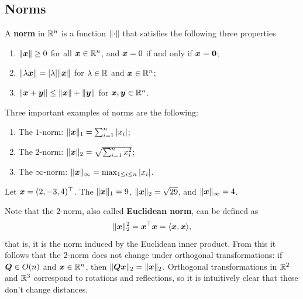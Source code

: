 \subsection{Norms}
A \textbf{norm} in $\mathbb{R}^n$ is a function $\Vert {\cdot}\Vert$ that satisfies the following three properties
\begin{enumerate}
 \item $\Vert {\bm{x}}\Vert\geq 0$ for all $\bm{x}\in \mathbb{R}^n$, and $\bm{x}=0$ if and only if $\bm{x}=\bm{0}$;
 \item $\Vert {\lambda \bm{x}}\Vert = |\lambda|\Vert {\bm{x}}\Vert$ for $\lambda\in \mathbb{R}$ and $\bm{x}\in \mathbb{R}^n$;
 \item $\Vert {\bm{x}+\bm{y}}\Vert\leq \Vert {\bm{x}}\Vert+\Vert {\bm{y}}\Vert$ for $\bm{x},\bm{y}\in \mathbb{R}^n$.
\end{enumerate}
Three important examples of norms are the following:
\begin{enumerate}
 \item The $1$-norm: $\Vert {\bm{x}}\Vert_1 = \sum_{i=1}^n |x_i|$;
 \item The $2$-norm: $\Vert {\bm{x}}\Vert_2 = \sqrt{\sum_{i=1}^n x_i^2}$;
 \item The $\infty$-norm: $\Vert {\bm{x}}\Vert_\infty = \max_{1\leq i\leq n} |x_i|$.
\end{enumerate}

\begin{example}
Let $\bm{x}=(2,-3,4)^{\top}$. The $\Vert {\bm{x}}\Vert_1=9$, $\Vert {\bm{x}}\Vert_2=\sqrt{29}$, and $\Vert {\bm{x}}\Vert_{\infty} = 4$. 
\end{example}

Note that the $2$-norm, also called \textbf{Euclidean norm}, can be defined as
\begin{equation*}
 \Vert {\bm{x}}\Vert_2^2 = \bm{x}^{\top}\bm{x} = \langle {\bm{x}}, {\bm{x}} \rangle,
\end{equation*}
that is, it is the norm induced by the Euclidean inner product. From this it follows that the $2$-norm does not change under orthogonal transformations: if $\bm{Q}\in O(n)$ and $\bm{x}\in \mathbb{R}^n$, then $\Vert {\bm{Q}\bm{x}}\Vert_2 = \Vert {\bm{x}}\Vert_2$. Orthogonal transformations in $\mathbb{R}^2$ and $\mathbb{R}^3$ correspond to rotations and reflections, so it is intuitively clear that these don't change distances.


